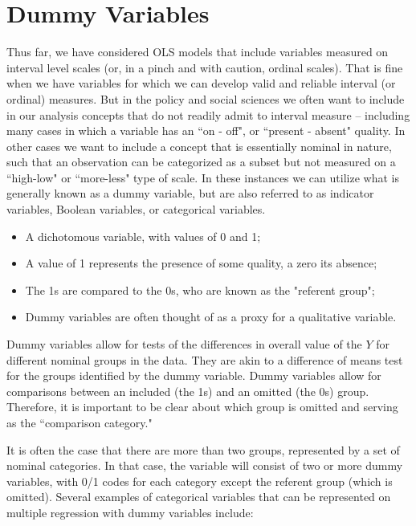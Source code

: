 \documentclass[11pt,openany]{book}\usepackage[]{graphicx}\usepackage[]{color}
\begin{document}
\section{Dummy Variables} 

Thus far, we have considered OLS models that include variables measured on interval level scales (or, in a pinch and with caution, ordinal scales). That is fine when we have variables for which we can develop valid and reliable interval (or ordinal) measures. But in the policy and social sciences we often want to include in our analysis concepts that do not readily admit to interval measure -- including many cases in which a variable has an ``on - off", or ``present - absent" quality. In other cases we want to include a concept that is essentially nominal in nature, such that an observation can be categorized as a subset but not measured on a ``high-low" or ``more-less" type of scale. In these instances we can utilize what is generally known as a dummy variable, but are also referred to as indicator variables, Boolean variables, or categorical variables.

\begin{grbox}

\begin{itemize}  
\item A dichotomous variable, with values of 0 and 1;
\item A value of 1 represents the presence of some quality, a zero its absence;
\item The 1s are compared to the 0s, who are known as the "referent group";
\item Dummy variables are often thought of as a proxy for a qualitative variable.
\end{itemize}  
\end{grbox}

Dummy variables allow for tests of the differences in overall value of the $Y$ for different nominal groups in the data. They are akin to a difference of means test for the groups identified by the dummy variable. Dummy variables allow for comparisons between an included (the 1s) and an omitted (the 0s) group. Therefore, it is important to be clear about which group is omitted and serving as the ``comparison category." 

It is often the case that there are more than two groups, represented by a set of nominal categories. In that case, the variable will consist of two or more dummy variables, with 0/1 codes for each category except the referent group (which is omitted). Several examples of categorical variables that can be represented on multiple regression with dummy variables include:
\end{document}

